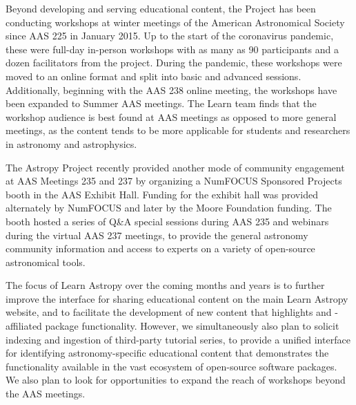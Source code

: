 \documentclass[modern]{aastex631}
\begin{document}
Beyond developing and serving educational content, the \astropy Project has been
conducting workshops at winter meetings of the American Astronomical Society
since AAS 225 in January 2015.
Up to the start of the coronavirus pandemic, these were full-day in-person
workshops with as many as 90 participants and a dozen facilitators from the
project.
During the pandemic, these workshops were moved to an online format and split
into basic and advanced sessions.
Additionally, beginning with the AAS 238 online meeting, the workshops have been
expanded to Summer AAS meetings.
The Learn team finds that the workshop audience is best found at AAS meetings as
opposed to more general \python meetings, as the content tends to be more
applicable for students and researchers in astronomy and astrophysics.

The Astropy Project recently provided another mode of community engagement at
AAS Meetings 235 and 237 by organizing a NumFOCUS Sponsored Projects booth in
the AAS Exhibit Hall.
Funding for the exhibit hall was provided alternately by NumFOCUS and later by
the Moore Foundation funding.
The booth hosted a series of Q\&A special sessions during AAS 235 and webinars
during the virtual AAS 237 meetings, to provide the general astronomy community
information and access to experts on a variety of open-source astronomical
tools.


The focus of Learn Astropy over the coming months and years is to further
improve the interface for sharing educational content on the main Learn Astropy
website, and to facilitate the development of new content that highlights
\astropypkg and \astropy-affiliated package functionality.
However, we simultaneously also plan to solicit indexing and ingestion of
third-party tutorial series, to provide a unified interface for identifying
astronomy-specific educational content that demonstrates the functionality
available in the vast ecosystem of open-source software packages.
We also plan to look for opportunities to expand the reach of \astropy workshops
beyond the AAS meetings.
\end{document}
